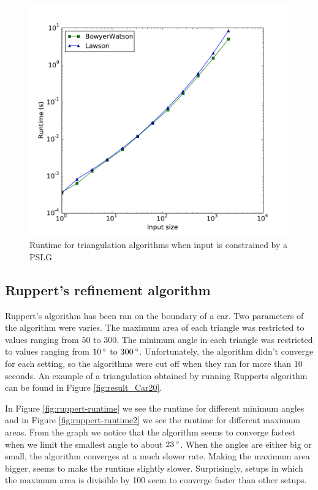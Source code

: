 \begin{figure}[ht]
    \centering
    \includegraphics[width=\columnwidth]{../images/runtime_segments.pdf}
    \caption{Runtime for triangulation algorithms when input is constrained by a PSLG}
    \label{fig:triangulation-pslg-runtime}
\end{figure}

\subsection{Ruppert's refinement algorithm}
\label{sub:results:ruppert}

Ruppert's algorithm has been ran on the boundary of a car.
Two parameters of the algorithm were varies.
The maximum area of each triangle was restricted to values ranging from $50$ to $300$.
The minimum angle in each triangle was restricted to values ranging from $10\,^{\circ}$ to $300\,^{\circ}$.
Unfortunately, the algorithm didn't converge for each setting, so the algorithms were cut off when they ran for more than $10$ seconds.
An example of a triangulation obtained by running Rupperts algorithm can be found in Figure \ref{fig:result_Car20}.

In Figure \ref{fig:ruppert-runtime} we see the runtime for different minimum angles and in Figure \ref{fig:ruppert-runtime2} we see the runtime for different maximum areas.
From the graph we notice that the algorithm seems to converge fastest when we limit the smallest angle to about $23\,^{\circ}$.
When the angles are either big or small, the algorithm converges at a much slower rate.
Making the maximum area bigger, seems to make the runtime slightly slower.
Surprisingly, setups in which the maximum area is divisible by 100 seem to converge faster than other setups.

